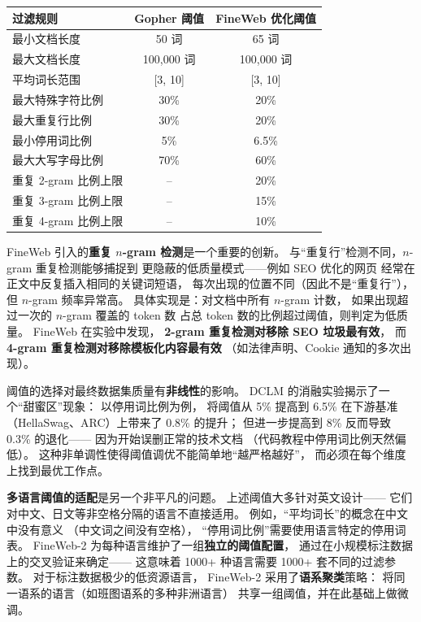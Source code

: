 \begin{center}
\small
\begin{tabular}{lcc}
\hline
\textbf{过滤规则} & \textbf{Gopher 阈值} & \textbf{FineWeb 优化阈值} \\
\hline
最小文档长度 & 50 词 & 65 词 \\
最大文档长度 & 100,000 词 & 100,000 词 \\
平均词长范围 & [3, 10] & [3, 10] \\
最大特殊字符比例 & 30\% & 20\% \\
最大重复行比例 & 30\% & 20\% \\
最小停用词比例 & 5\% & 6.5\% \\
最大大写字母比例 & 70\% & 60\% \\
重复 2-gram 比例上限 & -- & 20\% \\
重复 3-gram 比例上限 & -- & 15\% \\
重复 4-gram 比例上限 & -- & 10\% \\
\hline
\end{tabular}
\end{center}

FineWeb 引入的\textbf{重复 $n$-gram 检测}是一个重要的创新。
与``重复行''检测不同，$n$-gram 重复检测能够捕捉到
更隐蔽的低质量模式——例如 SEO 优化的网页
经常在正文中反复插入相同的关键词短语，
每次出现的位置不同（因此不是``重复行''），
但 $n$-gram 频率异常高。
具体实现是：对文档中所有 $n$-gram 计数，
如果出现超过一次的 $n$-gram 覆盖的 token 数
占总 token 数的比例超过阈值，则判定为低质量。
FineWeb 在实验中发现，
\textbf{2-gram 重复检测对移除 SEO 垃圾最有效}，
而 \textbf{4-gram 重复检测对移除模板化内容最有效}
（如法律声明、Cookie 通知的多次出现）。

阈值的选择对最终数据集质量有\textbf{非线性}的影响。
DCLM 的消融实验揭示了一个``甜蜜区''现象：
以停用词比例为例，
将阈值从 5\% 提高到 6.5\%
在下游基准（HellaSwag、ARC）上带来了 0.8\% 的提升；
但进一步提高到 8\%
反而导致 0.3\% 的退化——
因为开始误删正常的技术文档
（代码教程中停用词比例天然偏低）。
这种非单调性使得阈值调优不能简单地``越严格越好''，
而必须在每个维度上找到最优工作点。

\textbf{多语言阈值的适配}是另一个非平凡的问题。
上述阈值大多针对英文设计——
它们对中文、日文等非空格分隔的语言不直接适用。
例如，``平均词长''的概念在中文中没有意义
（中文词之间没有空格），
``停用词比例''需要使用语言特定的停用词表。
FineWeb-2 为每种语言维护了一组\textbf{独立的阈值配置}，
通过在小规模标注数据上的交叉验证来确定——
这意味着 1000+ 种语言需要 1000+ 套不同的过滤参数。
对于标注数据极少的低资源语言，
FineWeb-2 采用了\textbf{语系聚类}策略：
将同一语系的语言（如班图语系的多种非洲语言）
共享一组阈值，并在此基础上做微调。

